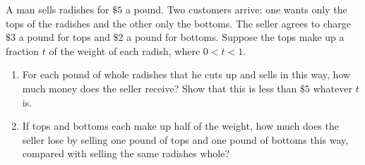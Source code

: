 A man sells radishes for $\$5$ a pound. Two customers arrive: one wants only the tops of the radishes and the other only the bottoms. The seller agrees to charge $\$3$ a pound for tops and $\$2$ a pound for bottoms. Suppose the tops make up a fraction $t$ of the weight of each radish, where $0<t<1$.
\begin{enumerate}
\item[(a)] For each pound of whole radishes that he cuts up and sells in this way, how much money does the seller receive? Show that this is less than $\$5$ whatever $t$ is.
\item[(b)] If tops and bottoms each make up half of the weight, how much does the seller lose by selling one pound of tops and one pound of bottoms this way, compared with selling the same radishes whole?
\end{enumerate}
